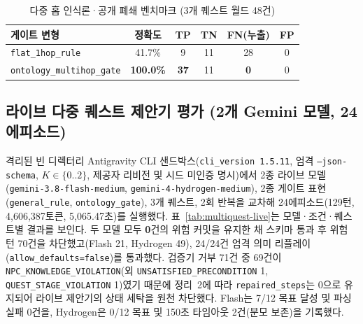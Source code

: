 \begin{table}[!tbp]
\caption{다중 홉 인식론·공개 폐쇄 벤치마크 (3개 퀘스트 월드 48건)}
\label{tab:multihop-ontology}
\centering
\footnotesize
\setlength{\tabcolsep}{3.5pt}
\begin{tabularx}{\columnwidth}{@{}>{\raggedright\arraybackslash}X*{5}{c}@{}}
\toprule
\textbf{게이트 변형} & \textbf{정확도} & \textbf{TP} & \textbf{TN} & \textbf{FN(누출)} & \textbf{FP} \\
\midrule
\texttt{flat\_}\allowbreak\texttt{1hop\_}\allowbreak\texttt{rule} & 41.7\% & 9 & 11 & 28 & 0 \\
\texttt{ontology\_}\allowbreak\texttt{multihop\_}\allowbreak\texttt{gate} & \textbf{100.0\%} & \textbf{37} & 11 & \textbf{0} & 0 \\
\bottomrule
\end{tabularx}
\end{table}

\subsection{라이브 다중 퀘스트 제안기 평가 (2개 Gemini 모델, 24에피소드)}\label{sec:multiquest-live}
{\sloppy 격리된 빈 디렉터리 Antigravity CLI 샌드박스(\texttt{cli\_}\allowbreak\texttt{version~1.5.11}, 엄격 \texttt{--json-}\allowbreak\texttt{schema}, $K{\in}\{0..2\}$, 제공자 리비전 및 시드 미인증 명시)에서 2종 라이브 모델(\texttt{gemini-3.8-}\allowbreak\texttt{flash-}\allowbreak\texttt{medium}, \texttt{gemini-4-}\allowbreak\texttt{hydrogen-}\allowbreak\texttt{medium}), 2종 게이트 표현(\texttt{general\_}\allowbreak\texttt{rule}, \texttt{ontology\_}\allowbreak\texttt{gate}), 3개 퀘스트, 2회 반복을 교차해 24에피소드(129턴, 4,606,387토큰, 5,065.47초)를 실행했다. 표~\ref{tab:multiquest-live}는 모델·조건·퀘스트별 결과를 보인다. 두 모델 모두 \textbf{0}건의 위험 커밋을 유지한 채 스키마 통과 후 위험 턴 70건을 차단했고(Flash 21, Hydrogen 49), 24/24건 엄격 의미 리플레이(\texttt{allow\_}\allowbreak\texttt{defaults=}\allowbreak\texttt{false})를 통과했다. 검증기 거부 71건 중 69건이 \texttt{NPC\_}\allowbreak\texttt{KNOWLEDGE\_}\allowbreak\texttt{VIOLATION}(외 \texttt{UNSATISFIED\_}\allowbreak\texttt{PRECONDITION} 1, \texttt{QUEST\_}\allowbreak\texttt{STAGE\_}\allowbreak\texttt{VIOLATION} 1)였기 때문에 정리~2에 따라 \texttt{repaired\_}\allowbreak\texttt{steps}는 0으로 유지되어 라이브 제안기의 상태 세탁을 원천 차단했다. Flash는 7/12 목표 달성 및 파싱 실패 0건을, Hydrogen은 0/12 목표 및 150초 타임아웃 2건(분모 보존)을 기록했다.\par}

